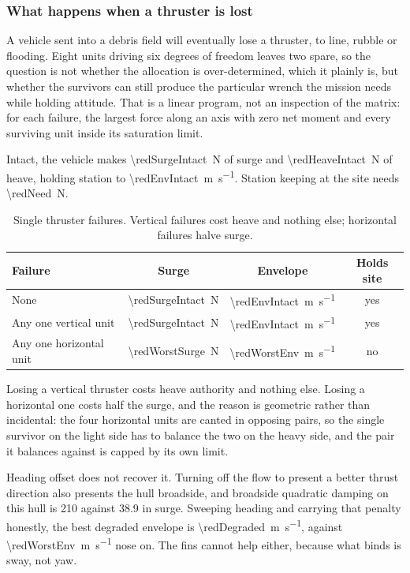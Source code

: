 \documentclass[10pt,a4paper]{article}
\begin{document}
\subsubsection{What happens when a thruster is lost}

A vehicle sent into a debris field will eventually lose a thruster, to line,
rubble or flooding. Eight units driving six degrees of freedom leaves two
spare, so the question is not whether the allocation is over-determined, which
it plainly is, but whether the survivors can still produce the particular
wrench the mission needs while holding attitude. That is a linear program, not
an inspection of the matrix: for each failure, the largest force along an axis
with zero net moment and every surviving unit inside its saturation limit.

Intact, the vehicle makes \SI{\redSurgeIntact}{\newton} of surge and
\SI{\redHeaveIntact}{\newton} of heave, holding station to
\SI{\redEnvIntact}{\metre\per\second}. Station keeping at the site needs
\SI{\redNeed}{\newton}.

\begin{table}[htbp]\centering\small
\caption{Single thruster failures. Vertical failures cost heave and nothing
else; horizontal failures halve surge.}
\begin{tabular}{lccc}
\toprule
\textbf{Failure} & \textbf{Surge} & \textbf{Envelope} & \textbf{Holds site} \\
\midrule
None & \SI{\redSurgeIntact}{\newton} & \SI{\redEnvIntact}{\metre\per\second}
& yes \\
Any one vertical unit & \SI{\redSurgeIntact}{\newton} &
\SI{\redEnvIntact}{\metre\per\second} & yes \\
Any one horizontal unit & \SI{\redWorstSurge}{\newton} &
\SI{\redWorstEnv}{\metre\per\second} & no \\
\bottomrule
\end{tabular}
\end{table}

Losing a vertical thruster costs heave authority and nothing else. Losing a
horizontal one costs half the surge, and the reason is geometric rather than
incidental: the four horizontal units are canted in opposing pairs, so the
single survivor on the light side has to balance the two on the heavy side, and
the pair it balances against is capped by its own limit.

Heading offset does not recover it. Turning off the flow to present a better
thrust direction also presents the hull broadside, and broadside quadratic
damping on this hull is \num{210} against \num{38.9} in surge. Sweeping heading
and carrying that penalty honestly, the best degraded envelope is
\SI{\redDegraded}{\metre\per\second}, against
\SI{\redWorstEnv}{\metre\per\second} nose on. The fins cannot help either, because what
binds is sway, not yaw.
\end{document}
